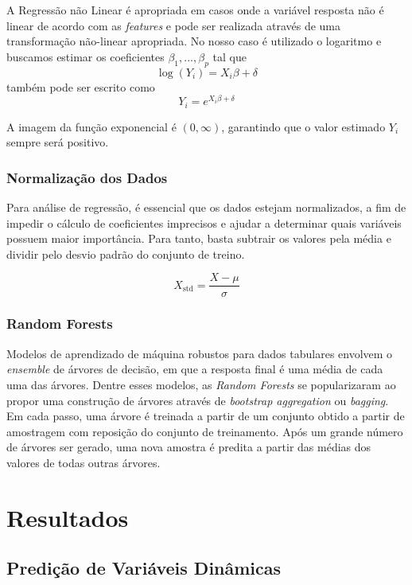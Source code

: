 A Regressão não Linear é apropriada em casos onde a variável resposta
não é linear de acordo com as \emph{features} e pode ser realizada
através de uma transformação não-linear apropriada. No nosso caso é
utilizado o logaritmo e buscamos estimar os coeficientes
\(\beta_1,...,\beta_p\) tal que \[
\log(Y_i) = X_i\beta+\delta 
\] também pode ser escrito como \[
Y_i = e^{X_i\beta+\delta} 
\]

A imagem da função exponencial é \((0,\infty)\), garantindo que o valor
estimado \(Y_i\) sempre será positivo.

\subsubsection{Normalização dos
Dados}\label{normalizauxe7uxe3o-dos-dados}

Para análise de regressão, é essencial que os dados estejam
normalizados, a fim de impedir o cálculo de coeficientes imprecisos e
ajudar a determinar quais variáveis possuem maior importância. Para
tanto, basta subtrair os valores pela média e dividir pelo desvio padrão
do conjunto de treino.

\[
X_{\text{std}}=\dfrac{X-\mu}{\sigma}
\]

\subsubsection{Random Forests}\label{random-forests}

Modelos de aprendizado de máquina robustos para dados tabulares envolvem
o \emph{ensemble} de árvores de decisão, em que a resposta final é uma
média de cada uma das árvores. Dentre esses modelos, as \emph{Random
Forests} se popularizaram ao propor uma construção de árvores através de
\emph{bootstrap aggregation} ou \emph{bagging}. Em cada passo, uma
árvore é treinada a partir de um conjunto obtido a partir de amostragem
com reposição do conjunto de treinamento. Após um grande número de
árvores ser gerado, uma nova amostra é predita a partir das médias dos
valores de todas outras árvores.

\section{Resultados}\label{resultados}

\subsection{Predição de Variáveis
Dinâmicas}\label{prediuxe7uxe3o-de-variuxe1veis-dinuxe2micas}

